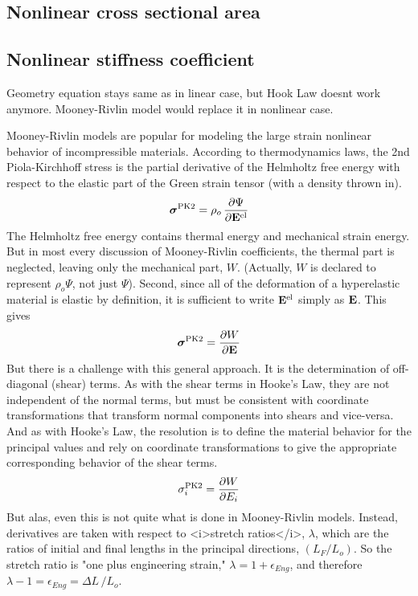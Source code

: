 \documentclass[12pt]{report}
\begin{document}
\subsection{Nonlinear cross sectional area}\par
\subsection{Nonlinear stiffness coefficient}\par
Geometry equation stays same as in linear case, but Hook Law doesnt work anymore. Mooney-Rivlin model would 
replace it in nonlinear case.\par
Mooney-Rivlin models are popular for modeling the large strain nonlinear behavior of incompressible materials. 
According to thermodynamics laws, the 2nd Piola-Kirchhoff stress is the partial derivative of the 
Helmholtz free energy with respect to the elastic part of the Green strain tensor (with a density thrown in).
\[
\boldsymbol{\sigma}^\text{PK2} = \rho_o \, {\partial \Psi \over \partial {\bf E}^\text{el} }
\]
The Helmholtz free energy contains thermal energy and mechanical strain energy.  
But in most every discussion of Mooney-Rivlin coefficients, the thermal
part is neglected, leaving only the mechanical part, \(W\).  (Actually, \(W\)
is declared to represent \(\rho_o \Psi\), not just \(\Psi\)).  Second, since 
all of the deformation of a hyperelastic material is elastic by definition,
it is sufficient to write \({\bf E}^\text{el}\) simply as \({\bf E}\).
This gives
\[
\boldsymbol{\sigma}^\text{PK2} = {\partial W \over \partial {\bf E} }
\]
But there is a challenge with this general approach.  It is the determination
of off-diagonal (shear) terms.  As with the shear terms in Hooke's Law, they
are not independent of the normal terms, but must be consistent with coordinate
transformations that transform normal components into shears and vice-versa.
And as with Hooke's Law, the resolution is to define the material behavior
for the principal values and rely on coordinate transformations to give
the appropriate corresponding behavior of the shear terms.
\[
\sigma_i^\text{PK2} = {\partial W \over \partial E_i }
\]
But alas, even this is not quite what is done in Mooney-Rivlin models.  Instead, derivatives
are taken with respect to <i>stretch ratios</i>, \(\lambda\), which are 
the ratios of initial and final lengths in the principal directions, 
\((L_F / L_o)\).  So the stretch ratio is
"one plus engineering strain,"  \(\lambda = 1 + \epsilon_{Eng}\), and 
therefore \(\lambda - 1 = \epsilon_{Eng} = \Delta L \, / L_o\).
\end{document}
